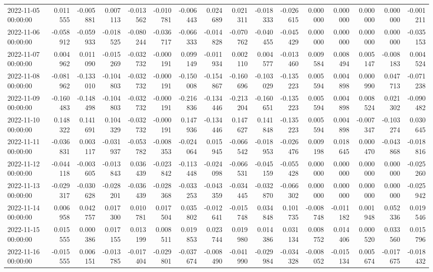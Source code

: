 \begin{tabular}{lrrrrrrrrrrrrrrr}
2022-11-05 00:00:00 & 0.011555 & -0.005881 & 0.007113 & -0.013562 & -0.010781 & -0.006443 & 0.024689 & 0.021311 & -0.018333 & -0.026615 & 0.000000 & 0.000000 & 0.000000 & 0.000000 & -0.001211 \\
2022-11-06 00:00:00 & -0.058912 & -0.059933 & -0.018525 & -0.080244 & -0.036717 & -0.066333 & -0.014828 & -0.070762 & -0.040455 & -0.045429 & 0.000000 & 0.000000 & 0.000000 & 0.000000 & -0.035153 \\
2022-11-07 00:00:00 & 0.004962 & 0.011090 & -0.015269 & -0.032732 & -0.000191 & 0.099149 & -0.011934 & 0.002110 & 0.004577 & -0.013460 & 0.009584 & 0.008494 & 0.005147 & -0.008183 & 0.004524 \\
2022-11-08 00:00:00 & -0.081962 & -0.133010 & -0.104803 & -0.032732 & -0.000191 & -0.150008 & -0.154867 & -0.160696 & -0.103029 & -0.135223 & 0.005594 & 0.004898 & 0.000990 & 0.047713 & -0.071238 \\
2022-11-09 00:00:00 & -0.160483 & -0.148498 & -0.104803 & -0.032732 & -0.000191 & -0.216836 & -0.134446 & -0.213204 & -0.160651 & -0.135223 & 0.005594 & 0.004898 & 0.008524 & 0.021302 & -0.090482 \\
2022-11-10 00:00:00 & 0.148322 & 0.141691 & 0.104329 & -0.032732 & -0.000191 & 0.147936 & -0.134446 & 0.147627 & 0.141848 & -0.135223 & 0.005594 & 0.004898 & -0.007347 & -0.103274 & 0.030645 \\
2022-11-11 00:00:00 & -0.036831 & 0.003117 & -0.031937 & -0.053782 & -0.008353 & -0.024064 & 0.015945 & -0.066542 & -0.018953 & -0.026476 & 0.009198 & 0.018645 & 0.000470 & -0.043868 & -0.018816 \\
2022-11-12 00:00:00 & -0.044118 & -0.003605 & -0.013843 & 0.036439 & -0.023842 & -0.113448 & -0.024098 & -0.066531 & -0.045159 & -0.055428 & 0.000000 & 0.000000 & 0.000000 & 0.000000 & -0.025260 \\
2022-11-13 00:00:00 & -0.029317 & -0.030628 & -0.028201 & -0.036439 & -0.028368 & -0.033253 & -0.043359 & -0.034445 & -0.032870 & -0.066302 & 0.000000 & 0.000000 & 0.000000 & 0.000000 & -0.025942 \\
2022-11-14 00:00:00 & 0.006958 & 0.042757 & 0.017300 & 0.010781 & 0.017504 & 0.035802 & -0.012641 & -0.015748 & 0.034848 & 0.101735 & -0.008748 & -0.011182 & 0.001948 & 0.052336 & 0.019546 \\
2022-11-15 00:00:00 & 0.015555 & 0.000386 & 0.017155 & 0.013199 & 0.008511 & 0.019853 & 0.023744 & 0.019980 & 0.014386 & 0.031134 & 0.008752 & 0.014406 & 0.000520 & 0.033560 & 0.015796 \\
2022-11-16 00:00:00 & -0.015555 & 0.006151 & -0.013785 & -0.017404 & -0.029801 & -0.037674 & -0.008490 & -0.041990 & -0.029984 & -0.034328 & -0.008052 & -0.015134 & 0.005674 & -0.017675 & -0.018432 \\

\end{tabular}
